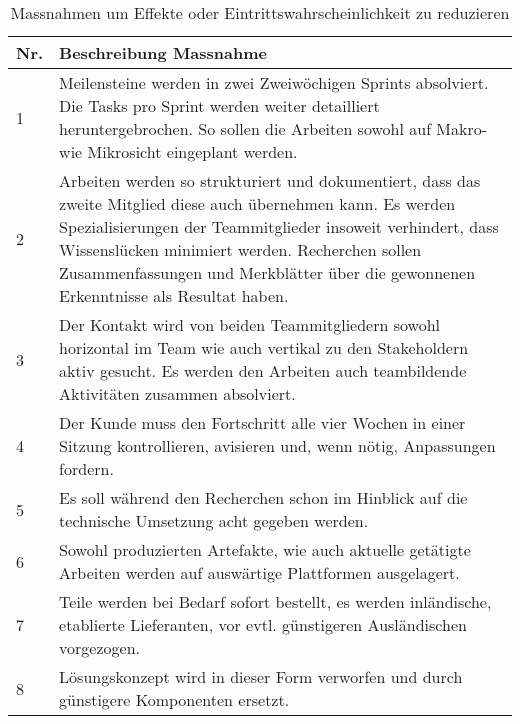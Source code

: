 \begin{table}[htb]
	\begin{tabularx}{\textwidth}{|l|X|}
		\hline
		\textbf{Nr.} & \textbf{Beschreibung Massnahme} \\
		\hline
		1 & Meilensteine werden in zwei Zweiwöchigen Sprints absolviert. Die Tasks pro Sprint werden weiter detailliert heruntergebrochen. So sollen die Arbeiten sowohl auf Makro- wie Mikrosicht eingeplant werden. \\
		\hline
		2 & Arbeiten werden so strukturiert und dokumentiert, dass das zweite Mitglied diese auch übernehmen kann. Es werden Spezialisierungen der Teammitglieder insoweit verhindert, dass Wissenslücken minimiert werden. Recherchen sollen Zusammenfassungen und Merkblätter über die gewonnenen Erkenntnisse als Resultat haben.\\
		\hline
		3 & Der Kontakt wird von beiden Teammitgliedern sowohl horizontal im Team wie auch vertikal zu den Stakeholdern aktiv gesucht. Es werden den Arbeiten auch teambildende Aktivitäten zusammen absolviert.\\
		\hline
		4 & Der Kunde muss den Fortschritt alle vier Wochen in einer Sitzung kontrollieren, avisieren und, wenn nötig, Anpassungen fordern.\\
		\hline
		5 & Es soll während den Recherchen schon im Hinblick auf die technische Umsetzung acht gegeben werden.\\
		\hline
		6 & Sowohl produzierten Artefakte, wie auch aktuelle getätigte Arbeiten werden auf auswärtige Plattformen ausgelagert.\\
		\hline
		7 & Teile werden bei Bedarf sofort bestellt, es werden inländische, etablierte Lieferanten, vor evtl. günstigeren Ausländischen vorgezogen.\\
		\hline
		8 & Lösungskonzept wird in dieser Form verworfen und durch günstigere Komponenten ersetzt.\\
		\hline
	\end{tabularx}
	\caption{Massnahmen um Effekte oder Eintrittswahrscheinlichkeit zu reduzieren}
\end{table}

\vspace{1em}

